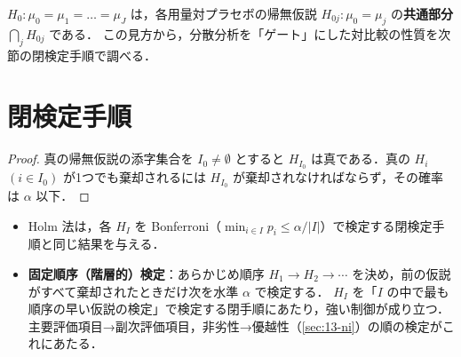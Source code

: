 $H_0:\mu_0=\mu_1=\dots=\mu_J$ は，各用量対プラセボの帰無仮説 $H_{0j}:\mu_0=\mu_j$ の\textbf{共通部分} $\bigcap_jH_{0j}$ である．
この見方から，分散分析を「ゲート」にした対比較の性質を次節の閉検定手順で調べる．

\section{閉検定手順}\label{sec:14-closed}
\Hissu
{}
\begin{proof}
真の帰無仮説の添字集合を $I_0\ne\emptyset$ とすると $H_{I_0}$ は真である．真の $H_i$ $(i\in I_0)$ が1つでも棄却されるには $H_{I_0}$ が棄却されなければならず，その確率は $\alpha$ 以下．
\end{proof}
\begin{itemize}
\item Holm 法は，各 $H_I$ を Bonferroni（$\min_{i\in I}p_i\le\alpha/|I|$）で検定する閉検定手順と同じ結果を与える．
\item \textbf{固定順序（階層的）検定}：あらかじめ順序 $H_1\to H_2\to\cdots$ を決め，前の仮説がすべて棄却されたときだけ次を水準 $\alpha$ で検定する．
      $H_I$ を「$I$ の中で最も順序の早い仮説の検定」で検定する閉手順にあたり，強い制御が成り立つ．主要評価項目→副次評価項目，非劣性→優越性（\cref{sec:13-ni}）の順の検定がこれにあたる．
\end{itemize}

